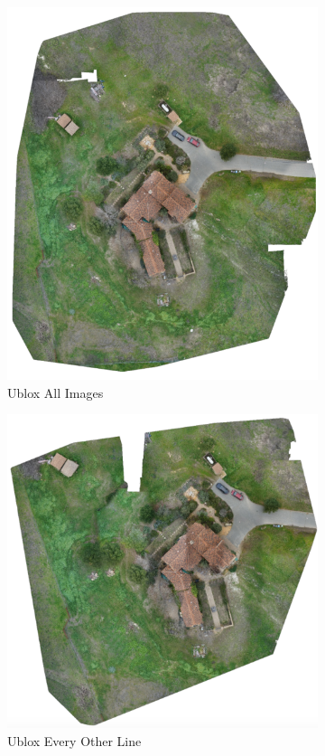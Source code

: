 \documentclass{article}
\begin{document}
\begin{figure}
\begin{subfigure}{.33\textwidth}
  \includegraphics[width=.72\linewidth]{images/orthomosaics/ublox.png}
  \caption{Ublox All Images}
  \label{fig:sub1}
\end{subfigure}%
\begin{subfigure}{.33\textwidth}
  \centering
  \includegraphics[width=.72\linewidth]{images/orthomosaics/ublox_every_other_line.png}
  \caption{Ublox Every Other Line}
  \label{fig:sub2}
\end{subfigure}
\begin{subfigure}{.33\textwidth}
  \centering

\end{subfigure}
\end{figure}
\end{document}
